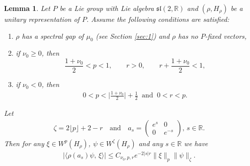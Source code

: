 \documentclass[11 pt]{amsart}
\newcommand{\RR}{\mathbb{R}}
\newtheorem{lemma}[theorem]{Lemma}
\theoremstyle{definition}
\numberwithin{equation}{section}
\begin{document}
\begin{lemma}\label{for:72} Let $P$ be a Lie group with Lie algebra $\mathfrak{sl}(2,\RR)$ and $(\rho,H_\rho)$ be a unitary representation of $P$.  Assume the following conditions are satisfied:
 \begin{enumerate}
   \item\label{for:155} $\rho$ has a spectral gap of $\mu_0$ (see Section \ref{sec:1}) and $\rho$ has no $P$-fixed vectors,

    \smallskip
   \item\label{for:214} if $\nu_0\geq0$, then
   \[
  \frac{1 + \nu_0}{2}<p<1,\qquad r>0,\qquad r+\frac{1 + \nu_0}{2}<1,
  \]
   \item\label{for:216} if $\nu_0<0$, then
  \begin{align*}
  0< p<\big|\frac{1 + \nu_0}{2}\big|+\frac{1}{2} \ \text{ and }\ 0<r<p.
  \end{align*}

\end{enumerate}
Let
\begin{align*}
 \zeta=2\lfloor p\rfloor+2-r\quad\text{and}\quad a_s = \begin{pmatrix} e^{s} & 0 \\[5pt]
0 & e^{-s} \end{pmatrix},\,s\in\RR.
\end{align*}
Then for any $\xi\in W^{p}(H_\rho)$, $\psi\in W^{\zeta}(H_\rho)$ and
  any $s\in\RR$ we have
  \begin{align*}
\big|\langle \rho(a_s)\psi,\, \xi\rangle \big|\leq C_{\nu_0,p,r}e^{-2|s|r} \| \xi \|_{p} \big\|\psi\big\|_{\zeta}.
\end{align*}

\end{lemma}
\end{document}
